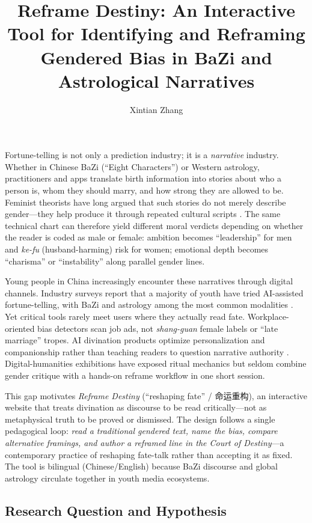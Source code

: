 \documentclass[stu,12pt,floatsintext]{apa7}
\title{Reframe Destiny: An Interactive Tool for Identifying and Reframing Gendered Bias in BaZi and Astrological Narratives}
\author{Xintian Zhang}
\affiliation{Generation AI 2026 Research Project}
\begin{document}
\maketitle

Fortune-telling is not only a prediction industry; it is a \emph{narrative} industry. Whether in Chinese BaZi (``Eight Characters'') or Western astrology, practitioners and apps translate birth information into stories about who a person is, whom they should marry, and how strong they are allowed to be. Feminist theorists have long argued that such stories do not merely describe gender---they help produce it through repeated cultural scripts \parencite{butler1990}. The same technical chart can therefore yield different moral verdicts depending on whether the reader is coded as male or female: ambition becomes ``leadership'' for men and \emph{ke-fu} (husband-harming) risk for women; emotional depth becomes ``charisma'' or ``instability'' along parallel gender lines.

Young people in China increasingly encounter these narratives through digital channels. Industry surveys report that a majority of youth have tried AI-assisted fortune-telling, with BaZi and astrology among the most common modalities \parencite{houlang2025}. Yet critical tools rarely meet users where they actually read fate. Workplace-oriented bias detectors scan job ads, not \emph{shang-guan} female labels or ``late marriage'' tropes. AI divination products optimize personalization and companionship rather than teaching readers to question narrative authority \parencite{bender2021}. Digital-humanities exhibitions have exposed ritual mechanics but seldom combine gender critique with a hands-on reframe workflow in one short session.

This gap motivates \textit{Reframe Destiny} (``reshaping fate'' / 命运重构), an interactive website that treats divination as discourse to be read critically---not as metaphysical truth to be proved or dismissed. The design follows a single pedagogical loop: \emph{read a traditional gendered text, name the bias, compare alternative framings, and author a reframed line in the Court of Destiny}---a contemporary practice of reshaping fate-talk rather than accepting it as fixed. The tool is bilingual (Chinese/English) because BaZi discourse and global astrology circulate together in youth media ecosystems.

\subsection{Research Question and Hypothesis}
\end{document}
